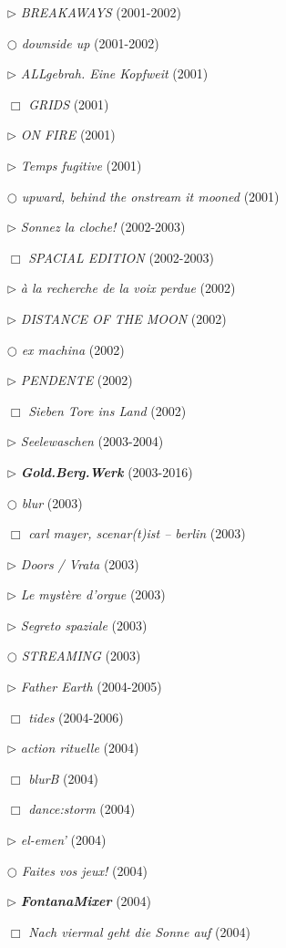 \documentclass[a4paper,12pt]{article}
\begin{document}
\begin{itemize}
\item[$\rhd$] \emph{BREAKAWAYS} (2001-2002)
\item[$\bigcirc$] \emph{downside up} (2001-2002)
\item[$\rhd$] \emph{ALLgebrah. Eine Kopfweit} (2001)
\item[$\Box$] \emph{GRIDS} (2001)
\item[$\rhd$] \emph{ON FIRE} (2001)
\item[$\rhd$] \emph{Temps fugitive} (2001)
\item[$\bigcirc$] \emph{upward, behind the onstream it mooned} (2001)
\item[$\rhd$] \emph{Sonnez la cloche!} (2002-2003)
\item[$\Box$] \emph{SPACIAL EDITION} (2002-2003)
\item[$\rhd$] \emph{à la recherche de la voix perdue} (2002)
\item[$\rhd$] \emph{DISTANCE OF THE MOON} (2002)
\item[$\bigcirc$] \emph{ex machina} (2002)
\item[$\rhd$] \emph{PENDENTE} (2002)
\item[$\Box$] \emph{Sieben Tore ins Land} (2002)
\item[$\rhd$] \emph{Seelewaschen} (2003-2004)
\item[$\rhd$] \textbf{\emph{Gold.Berg.Werk}} (2003-2016)
\item[$\bigcirc$] \emph{blur} (2003)
\item[$\Box$] \emph{carl mayer, scenar(t)ist – berlin} (2003)
\item[$\rhd$] \emph{Doors / Vrata} (2003)
\item[$\rhd$] \emph{Le mystère d'orgue} (2003)
\item[$\rhd$] \emph{Segreto spaziale} (2003)
\item[$\bigcirc$] \emph{STREAMING} (2003)
\item[$\rhd$] \emph{Father Earth} (2004-2005)
\item[$\Box$] \emph{tides} (2004-2006)
\item[$\rhd$] \emph{action rituelle} (2004)
\item[$\Box$] \emph{blurB} (2004)
\item[$\Box$] \emph{dance:storm} (2004)
\item[$\rhd$] \emph{el-emen'} (2004)
\item[$\bigcirc$] \emph{Faites vos jeux!} (2004)
\item[$\rhd$] \textbf{\emph{FontanaMixer}} (2004)
\item[$\Box$] \emph{Nach viermal geht die Sonne auf} (2004)

\end{itemize}
\end{document}
